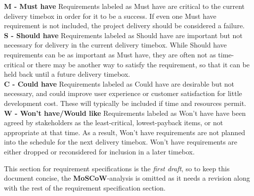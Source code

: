 \textbf{M - Must have}
Requirements labeled as Must have are critical to the current delivery timebox in order for it to be a success. If even one Must have requirement is not included, the project delivery should be considered a failure. \\

\textbf{S - Should have}
Requirements labeled as Should have are important but not necessary for delivery in the current delivery timebox. While Should have requirements can be as important as Must have, they are often not as time-critical or there may be another way to satisfy the requirement, so that it can be held back until a future delivery timebox. \\

\textbf{C - Could have}
Requirements labeled as Could have are desirable but not necessary, and could improve user experience or customer satisfaction for little development cost. These will typically be included if time and resources permit. \\

\textbf{W - Won't have/Would like}
Requirements labeled as Won't have have been agreed by stakeholders as the least-critical, lowest-payback items, or not appropriate at that time. As a result, Won't have requirements are not planned into the schedule for the next delivery timebox. Won't have requirements are either dropped or reconsidered for inclusion in a later timebox. \newline

This section for requirement specifications is the \textit{first draft}, so to keep this document concise, the \textbf{MoSCoW}-analysis is omitted as it needs a revision along with the rest of the requirement specification section.